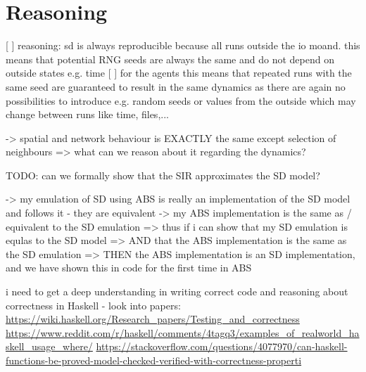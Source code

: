 \section{Reasoning}
[ ] reasoning: sd is always reproducible because all runs outside the io moand. this means that potential RNG seeds are always the same and do not depend on outside states e.g. time
[ ] for the agents this means that repeated runs with the same seed are guaranteed to result in the same dynamics as there are again no possibilities to introduce e.g. random seeds or values from the outside which may change between runs like time, files,...

-> spatial and network behaviour is EXACTLY the same except selection of neighbours => what can we reason about it regarding the dynamics?

TODO: can we formally show that the SIR approximates the SD model?

		-> my emulation of SD using ABS is really an implementation of the SD model and follows it - they are equivalent
		-> my ABS implementation is the same as / equivalent to the SD emulation
			=> thus if i can show that my SD emulation is equlas to the SD model
			=> AND that the ABS implementation is the same as the SD emulation
			=> THEN the ABS implementation is an SD implementation, and we have shown this in code for the first time in ABS


i need to get a deep understanding in writing correct code and reasoning about correctness in Haskell - look into papers:
\url{https://wiki.haskell.org/Research_papers/Testing_and_correctness}
\url{https://www.reddit.com/r/haskell/comments/4tagq3/examples_of_realworld_haskell_usage_where/}
\url{https://stackoverflow.com/questions/4077970/can-haskell-functions-be-proved-model-checked-verified-with-correctness-properti}\\